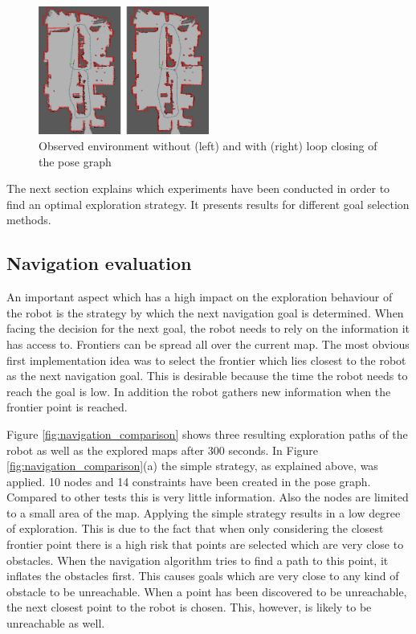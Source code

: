 \documentclass{ba-kecs}
\begin{document}
\begin{figure}[htbp]
	\centering
		\includegraphics[width=0.50\textwidth]{figures/Loop_closing_compared.jpg}
	\caption{Observed environment without (left) and with (right) loop closing of the pose graph}
	\label{fig:loop_closing_comparison}
\end{figure}
The next section explains which experiments have been conducted in order to find an optimal exploration strategy. It presents results for different goal selection methods.
\subsection{Navigation evaluation}
An important aspect which has a high impact on the exploration behaviour of the robot is the strategy by which the next navigation goal is determined. When facing the decision for the next goal, the robot needs to rely on the information it has access to. Frontiers can be spread all over the current map. The most obvious first implementation idea was to select the frontier which lies closest to the robot as the next navigation goal. This is desirable because the time the robot needs to reach the goal is low. In addition the robot gathers new information when the frontier point is reached.

Figure \ref{fig:navigation_comparison} shows three resulting exploration paths of the robot as well as the explored maps after 300 seconds. In Figure \ref{fig:navigation_comparison}(a) the simple strategy, as explained above, was applied. 10 nodes and 14 constraints have been created in the pose graph. Compared to other tests this is very little information. Also the nodes are limited to a small area of the map. Applying the simple strategy results in a low degree of exploration. This is due to the fact that when only considering the closest frontier point there is a high risk that points are selected which are very close to obstacles. When the navigation algorithm tries to find a path to this point, it inflates the obstacles first. This causes goals which are very close to any kind of obstacle to be unreachable. When a point has been discovered to be unreachable, the next closest point to the robot is chosen. This, however, is likely to be unreachable as well.
\end{document}
